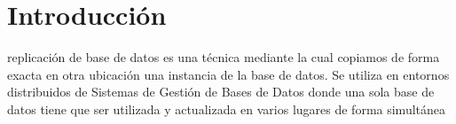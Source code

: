 \section{Introducción}

 replicación de base de datos es una técnica mediante la cual copiamos de forma exacta en otra ubicación una instancia de la base de datos. Se utiliza en entornos distribuidos de Sistemas de Gestión de Bases de Datos donde una sola base de datos tiene que ser utilizada y actualizada en varios lugares de forma simultánea



